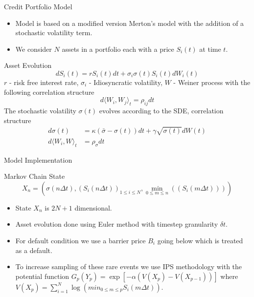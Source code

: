 \begin{frame}{Credit Portfolio Model}
	\begin{itemize}
		\item Model is based on a modified version Merton's model with the
		      addition of a stochastic volatility term.
		\item We consider $N$ assets in a portfolio each with a price $S_i(t)$
		      at time $t$.
	\end{itemize}
	\begin{block}{Asset Evolution}
		\begin{equation*}
			dS_{i}(t) = rS_{i}(t)dt + \sigma_{i}\sigma(t)S_{i}(t)dW_{i}(t)
		\end{equation*}
		$r$ - risk free interest rate, $\sigma_i$ - Idiosyncratic volatility,
		$W$ - Weiner process with the following correlation structure
		\begin{equation*}
			d \langle W_{i}, W_{j} \rangle_{t} = \rho_{ij}dt
		\end{equation*}
		The stochastic volatility $\sigma(t)$ evolves according to the SDE,
		correlation structure
		\begin{equation*}
			\begin{split}
				d\sigma(t) &= \kappa(\bar{\sigma} - \sigma(t)) dt + \gamma \sqrt{\sigma(t)} dW(t) \\
				d \langle W_{i}, W \rangle_{t} &= \rho_{\sigma}dt
			\end{split}
		\end{equation*}
	\end{block}
\end{frame}

\begin{frame}{Model Implementation}
	\begin{block}{Markov Chain State}
		\begin{equation*}
			X_{n} = \left( \sigma \left( n \Delta t \right), \left( S_i \left( n \Delta
			t\right) \right)_{1 \leq i \leq N} , \min_{0 \leq m \leq n} \left( \left( S_i
			\left( m \Delta t \right) \right) \right) \right)
		\end{equation*}
	\end{block}
	\begin{itemize}
		\item State $X_n$ is $2N+1$ dimensional.
		\item Asset evolution done using Euler method with timestep granularity
		      $\delta t$.
		\item For default condition we use a barrier price $B_i$ going below
		      which is treated as a default.
		\item To increase sampling of these rare events we use IPS methodology
		      with the potential function $G_{p}(Y_{p}) = \exp[-\alpha (V(X_p) -
		      V(X_{p-1}))]$ where $V(X_p) = \sum_{i=1}^N \log (min_{0\leq m
		      	\leq p}S_{i}(m \Delta t))$.
	\end{itemize}
\end{frame}
